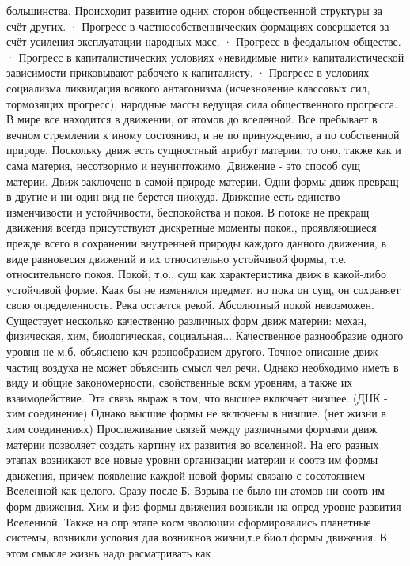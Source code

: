 \documentclass[12pt]{article}
\begin{document}
большинства. Происходит развитие одних сторон общественной структуры за счёт других.
· Прогресс в частнособственнических формациях совершается за счёт усиления эксплуатации народных масс.
· Прогресс в феодальном обществе.
· Прогресс в капиталистических условиях «невидимые нити» капиталистической зависимости приковывают
рабочего к капиталисту.
· Прогресс в условиях социализма ликвидация всякого антагонизма (исчезновение классовых сил, тормозящих
прогресс), народные массы ведущая сила общественного прогресса.
В мире все находится в движении, от атомов до вселенной. Все пребывает в вечном стремлении к иному
состоянию,  и  не  по  принуждению,  а  по  собственной  природе.  Поскольку  движ  есть  сущностный  атрибут
материи, то оно, также как и сама материя, несотворимо и неуничтожимо. Движение - это способ сущ материи.
Движ заключено в самой природе материи. Одни формы движ превращ в другие и ни один вид не берется
ниокуда. 
Движение есть единство изменчивости и устойчивости, беспокойства и покоя. В потоке не прекращ движения
всегда  присутствуют  дискретные  моменты  покоя.,  проявляющиеся  прежде  всего  в  сохранении  внутренней
природы каждого данного движения, в виде равновесия движений и их относительно устойчивой формы, т.е.
относительного покоя. Покой, т.о., сущ как характеристика движ в какой-либо устойчивой форме. Каак бы не
изменялся предмет, но пока он сущ, он сохраняет свою определенность. Река остается рекой.
Абсолютный покой невозможен.
Существует несколько качественно различных форм движ материи: механ, физическая, хим, биологическая,
социальная... Качественное разнообразие одного уровня не м.б. объяснено кач разнообразием другого. Точное
описание движ частиц воздуха не может объяснить смысл чел речи. Однако необходимо иметь в виду и общие
закономерности, свойственные вскм уровням, а также их взаимодействие. Эта связь выраж в том, что высшее
включает низшее. (ДНК - хим соединение) Однако высшие формы не включены в низшие. (нет жизни в хим
соединениях)
Прослеживание связей между различными формами движ материи позволяет создать картину их развития во
вселенной.  На  его  разных  этапах  возникают  все  новые  уровни  организации  материи  и  соотв  им  формы
движения, причем появление каждой новой формы связано с сосотоянием Вселенной как целого. Сразу после Б.
Взрыва не было ни атомов ни соотв им форм движения. Хим и физ формы движения возникли на опред уровне
развития  Вселенной.  Также  на  опр  этапе  косм  эволюции  сформировались  планетные  системы,  возникли
условия  для  возникнов  жизни,т.е  биол  формы  движения.  В  этом  смысле  жизнь  надо  расматривать  как
\end{document}
